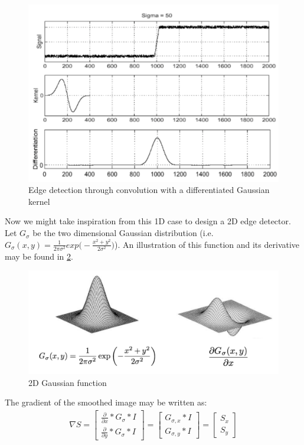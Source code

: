 \documentclass[twoside]{article}
\begin{document}
\begin{figure}[h]
  \centering
  \includegraphics[scale=.5]{better_kernel.PNG}
    \caption{Edge detection through convolution with a differentiated Gaussian kernel}
    \label{ker}
\end{figure}

Now we might take inspiration from this 1D case to design a 2D edge detector. Let $G_\sigma$ be the two dimensional Gaussian distribution (i.e. $G_\sigma(x,y)=\frac{1}{2\pi\sigma^2}exp\bigg(-\frac{x^2+y^2}{2\sigma^2}\bigg)$). An illustration of this function and its derivative may be found in \ref{2dgauss}.

\begin{figure}[h]
  \centering
  \includegraphics[scale=.3]{2d_equivalent.PNG}
    \caption{2D Gaussian function}
    \label{2dgauss}
\end{figure}

The gradient of the smoothed image may be written as:
\begin{gather*}
\nabla S= \begin{bmatrix}
\frac{\partial}{\partial x} * G_\sigma * I \\ \frac{\partial}{\partial y} * G_\sigma * I \end{bmatrix}= \begin{bmatrix}
G_{\sigma,x} * I\\G_{\sigma,y} * I
\end{bmatrix}=\begin{bmatrix}
S_x\\S_y
\end{bmatrix}
\end{gather*}
\end{document}
